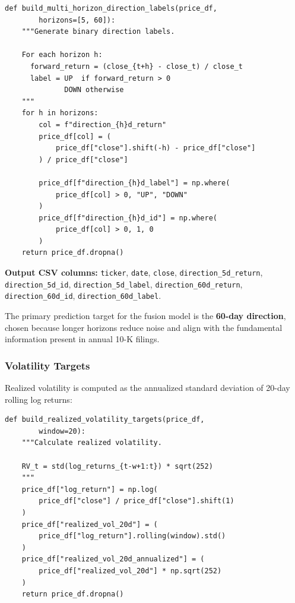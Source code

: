 \documentclass[12pt, a4paper]{article}
\begin{document}
\begin{lstlisting}[caption={Multi-horizon direction label generation}]
def build_multi_horizon_direction_labels(price_df,
        horizons=[5, 60]):
    """Generate binary direction labels.
    
    For each horizon h:
      forward_return = (close_{t+h} - close_t) / close_t
      label = UP  if forward_return > 0
              DOWN otherwise
    """
    for h in horizons:
        col = f"direction_{h}d_return"
        price_df[col] = (
            price_df["close"].shift(-h) - price_df["close"]
        ) / price_df["close"]
        
        price_df[f"direction_{h}d_label"] = np.where(
            price_df[col] > 0, "UP", "DOWN"
        )
        price_df[f"direction_{h}d_id"] = np.where(
            price_df[col] > 0, 1, 0
        )
    return price_df.dropna()
\end{lstlisting}

\textbf{Output CSV columns:} \texttt{ticker}, \texttt{date}, \texttt{close}, \texttt{direction\_5d\_return}, \texttt{direction\_5d\_id}, \texttt{direction\_5d\_label}, \texttt{direction\_60d\_return}, \texttt{direction\_60d\_id}, \texttt{direction\_60d\_label}.

The primary prediction target for the fusion model is the \textbf{60-day direction}, chosen because longer horizons reduce noise and align with the fundamental information present in annual 10-K filings.

\subsubsection{Volatility Targets}

Realized volatility is computed as the annualized standard deviation of 20-day rolling log returns:

\begin{lstlisting}[caption={Realized volatility target generation}]
def build_realized_volatility_targets(price_df,
        window=20):
    """Calculate realized volatility.
    
    RV_t = std(log_returns_{t-w+1:t}) * sqrt(252)
    """
    price_df["log_return"] = np.log(
        price_df["close"] / price_df["close"].shift(1)
    )
    price_df["realized_vol_20d"] = (
        price_df["log_return"].rolling(window).std()
    )
    price_df["realized_vol_20d_annualized"] = (
        price_df["realized_vol_20d"] * np.sqrt(252)
    )
    return price_df.dropna()
\end{lstlisting}
\end{document}
